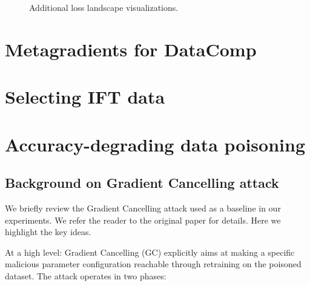 \documentclass{article}
\begin{document}
\begin{figure}
    \centering 
\newcommand{\plotnumber}{1118}
\newcommand{\zmin}{-1}
\newcommand{\zmax}{11}
\newcommand{\zdist}{3}


\vspace{.3cm}
\renewcommand{\plotnumber}{3349}
\renewcommand{\zmin}{-1}
\renewcommand{\zmax}{11}
\renewcommand{\zdist}{3}


\vspace{.3cm}
\renewcommand{\plotnumber}{10600}
\renewcommand{\zmin}{-1}
\renewcommand{\zmax}{9}
\renewcommand{\zdist}{3}


\vspace{.3cm}
\renewcommand{\plotnumber}{15578}
\renewcommand{\zmin}{-1}
\renewcommand{\zmax}{9}
\renewcommand{\zdist}{3}

\caption{Additional loss landscape visualizations.}
\label{fig:more_landscapes}
\end{figure}



\clearpage
\section{Metagradients for DataComp}
\label{app:clip_details}


\clearpage
\section{Selecting IFT data}
\label{app:less}


\clearpage
\section{Accuracy-degrading data poisoning}
\label{app:poisoning}

\subsection{Background on Gradient Cancelling attack}
We briefly review the Gradient Cancelling attack \citep{lu2023exploring}
used as a baseline in our experiments. We refer the reader to the original
paper for details. Here we highlight the key ideas.

At a high level: Gradient Cancelling (GC) explicitly aims at making a specific
malicious parameter configuration reachable through retraining on the poisoned
dataset. The attack operates in two phases:
\end{document}
